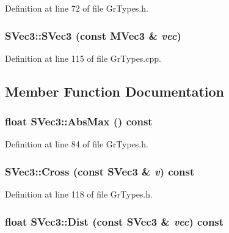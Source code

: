 Definition at line 72 of file GrTypes.h.\hypertarget{struct_s_vec3_6b9a2eabcdf8d8044f184a1962ae5d5a}{
\subsubsection[{SVec3}]{\setlength{\rightskip}{0pt plus 5cm}SVec3::SVec3 (const {\bf MVec3} \& {\em vec})}}
\label{struct_s_vec3_6b9a2eabcdf8d8044f184a1962ae5d5a}




Definition at line 115 of file GrTypes.cpp.

\subsection{Member Function Documentation}
\hypertarget{struct_s_vec3_250acbecacb21eda69e976bbab1866df}{
\subsubsection[{AbsMax}]{\setlength{\rightskip}{0pt plus 5cm}float SVec3::AbsMax () const}}
\label{struct_s_vec3_250acbecacb21eda69e976bbab1866df}




Definition at line 84 of file GrTypes.h.\hypertarget{struct_s_vec3_2f8cd2997092116b29bed46041e4dcc3}{
\subsubsection[{Cross}]{ SVec3::Cross (const {\bf SVec3} \& {\em v}) const}}
\label{struct_s_vec3_2f8cd2997092116b29bed46041e4dcc3}




Definition at line 118 of file GrTypes.h.\hypertarget{struct_s_vec3_28f033f4e9073dcbe27d385e2cba1929}{
\subsubsection[{Dist}]{\setlength{\rightskip}{0pt plus 5cm}float SVec3::Dist (const {\bf SVec3} \& {\em vec}) const}}
\label{struct_s_vec3_28f033f4e9073dcbe27d385e2cba1929}




